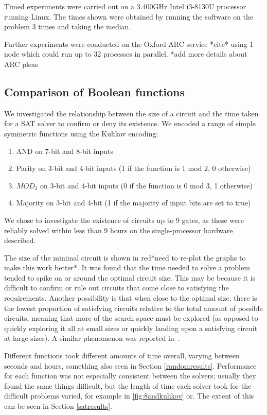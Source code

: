 \documentclass{article}
\begin{document}
Timed experiments were carried out on a 3.400GHz Intel i3-8130U processor running Linux. The times shown were obtained by running the software on the problem 3 times and taking the median.

Further experiments were conducted on the Oxford ARC service *cite* using 1 node which could run up to 32 processes in parallel. *add more details about ARC pleas

\subsection{Comparison of Boolean functions}\label{funcresults}

We investigated the relationship between the size of a circuit and the time taken for a SAT solver to confirm or deny its existence. We encoded a range of simple symmetric functions using the Kulikov encoding:

\begin{enumerate}
  \item AND on 7-bit and 8-bit inputs
  \item Parity on 3-bit and 4-bit inputs (1 if the function is 1 mod 2, 0 otherwise)
  \item \(MOD_3\) on 3-bit and 4-bit inputs (0 if the function is 0 mod 3, 1 otherwise)
  \item Majority on 3-bit and 4-bit  (1 if the majority of input bits are set to true)
\end{enumerate}

We chose to investigate the existence of circuits up to 9 gates, as these were reliably solved within less than 9 hours on the single-processor hardware described.

The size of the minimal circuit is shown in red*need to re-plot the graphs to make this work better*. It was found that the time needed to solve a problem tended to spike on or around the optimal circuit size. This may be because it is difficult to confirm or rule out circuits that come close to satisfying the requirements. Another possibility is that when close to the optimal size, there is the lowest proportion of satisfying circuits relative to the total amount of possible circuits, meaning that more of the search space must be explored (as opposed to quickly exploring it all at small sizes or quickly landing upon a satisfying circuit at large sizes). A similar phenomenon was reported in~\cite{estrada}. 

Different functions took different amounts of time overall, varying between seconds and hours, something also seen in Section \ref{randomresults}. Performance for each function was not especially consistent between the solvers; usually they found the same things difficult, but the length of time each solver took for the difficult problems varied, for example in \ref{fig:8andkulikov} or. The extent of this can be seen in Section \ref{satresults}.
\end{document}
